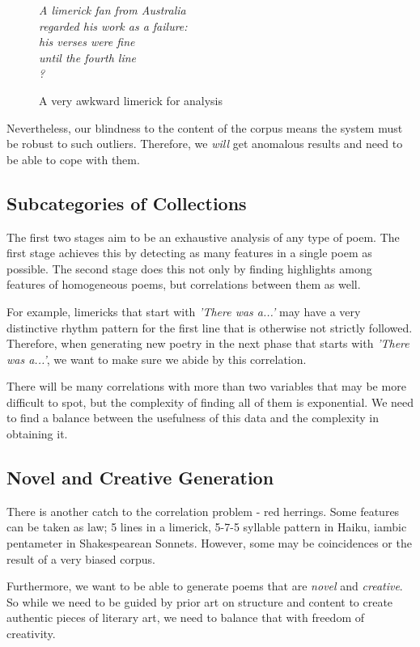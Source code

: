 \begin{figure}[h!]
\centering
\textit{
A limerick fan from Australia\\
regarded his work as a failure:\\
his verses were fine\\
until the fourth line\\
?
}
\caption{A very awkward limerick for analysis}
\label{fig:awkward-limerick}
\end{figure}
Nevertheless, our blindness to the content of the corpus means the system must be robust to such outliers. Therefore, we \textit{will} get anomalous results and need to be able to cope with them.

\subsection{Subcategories of Collections}

The first two stages aim to be an exhaustive analysis of any type of poem. The first stage achieves this by detecting as many features in a single poem as possible. The second stage does this not only by finding highlights among features of homogeneous poems, but correlations between them as well.

For example, limericks that start with \textit{'There was a...'} may have a very distinctive rhythm pattern for the first line that is otherwise not strictly followed. Therefore, when generating new poetry in the next phase that starts with \textit{'There was a...'}, we want to make sure we abide by this correlation.

There will be many correlations with more than two variables that may be more difficult to spot, but the complexity of finding all of them is exponential. We need to find a balance between the usefulness of this data and the complexity in obtaining it.

\subsection{Novel and Creative Generation}

There is another catch to the correlation problem - red herrings. Some features can be taken as law; 5 lines in a limerick, 5-7-5 syllable pattern in Haiku, iambic pentameter in Shakespearean Sonnets. However, some may be coincidences or the result of a very biased corpus.

Furthermore, we want to be able to generate poems that are \textit{novel} and \textit{creative}. So while we need to be guided by prior art on structure and content to create authentic pieces of literary art, we need to balance that with freedom of creativity. 


